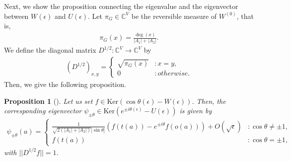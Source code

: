 \documentclass[12pt]{article}
\newtheorem{proposition}{Proposition}
\numberwithin{lemma}{section}
\numberwithin{proposition}{section}
\numberwithin{remark}{section}
\numberwithin{definition}{section}
\begin{document}
Next, we show the proposition connecting the eigenvalue and the eigenvector between $W(\epsilon)$ and $U(\epsilon)$.
Let $\pi_{G} \in \mathbb{C}^{V}$ be the reversible measure of $W^{(0)}$, that is,
\begin{align*}
    \pi_{G}(x)=\frac{\deg(x)}{|A_{1}|+|A_{2}|}.
\end{align*}
We define the diagonal matrix $D^{1/2}: \mathbb{C}^{V}\rightarrow \mathbb{C}^{V}$ by
\begin{align*}
    (D^{1/2})_{x,y}=
    \begin{cases}
        \sqrt{\pi_{G}(x)} &:x=y, \\
        0 &:otherwise.
    \end{cases}
\end{align*}
Then, we give the following proposition.
\begin{proposition}[\cite{HKSS}]
    \label{prop: SMT}
    Let us set $f \in \mathrm{Ker}(\cos \theta (\epsilon)-W(\epsilon))$. Then, the corresponding eigenvector $\psi_{\pm \theta} \in \mathrm{Ker}(e^{\pm i \theta (\epsilon)}-U(\epsilon))$ is given by
    \begin{align*}
        \psi_{\pm \theta}(a)=
        \begin{cases}
            \displaystyle\frac{1}{\sqrt{2(|A_{1}|+|A_{2}|)}|\sin \theta|}(f(t(a))-e^{\pm i \theta} f(o(a)))+O(\sqrt{\epsilon}) &: \cos \theta \neq \pm 1, \\
            f(t(a)) &: \cos \theta=\pm 1,
        \end{cases}
    \end{align*}
    with $||D^{1/2}f||=1$.
\end{proposition}
\end{document}
